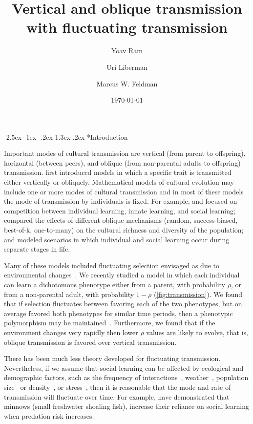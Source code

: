 \documentclass[12pt]{extarticle} %
\title{Vertical and oblique transmission with fluctuating transmission}
\author[a]{Yoav Ram}
\author[b]{Uri Liberman}
\author[a]{Marcus W. Feldman}
\affil[a]{Department of Biology, Stanford University, Stanford, CA}
\affil[b]{School of Mathematical Sciences, Tel Aviv University, Israel}
\date{\today}
\makeatletter
\renewcommand\section{\@startsection {section}{1}{\z@}%
     {-2.5ex \@plus -1ex \@minus -.2ex}%
     {1.3ex \@plus.2ex}%
    {\Large\bfseries}}
\makeatother
\begin{document}
\maketitle


\section*{Introduction}

Important modes of cultural transmission are vertical (from parent to offspring), horizontal (between peers), and oblique (from non-parental adults to offspring) transmission. 
\citet[ch.~3]{Cavalli-Sforza1981} first introduced models in which a specific trait is transmitted either vertically or obliquely.
Mathematical models of cultural evolution may include one or more modes of cultural transmission and in most of these models the mode of transmission by individuals is fixed. 
For example, \cite{Aoki2005} and \citet{McElreath2008} focused on competition between individual learning, innate learning, and social learning; \citet{Fogarty2017} compared the effects of different oblique mechanisms (random, success-biased, best-of-k, one-to-many) on the cultural richness and diversity of the population; and \citet{Aoki2012} modeled scenarios in which individual and social learning occur during separate stages in life.

Many of these models included fluctuating selection envisaged as due to environmental changes~\citep[reviewed in][]{Aoki2014}. 
We recently studied a model in which each individual can learn a dichotomous phenotype either from a parent, with probability $\rho$, or from a non-parental adult, with probability $1-\rho$ (\autoref{fig:transmission}).
We found that if selection fluctuates between favoring each of the two phenotypes, but on average favored both phenotypes for similar time periods, then a phenotypic polymorphism may be maintained~\citep{Ram2018}.
Furthermore, we found that if the environment changes very rapidly then lower $\rho$ values are likely to evolve, that is, oblique transmission is favored over vertical transmission.

There has been much less theory developed for fluctuating transmission.
Nevertheless, if we assume that social learning can be affected by ecological and demographic factors, such as the frequency of interactions~\citep{VanSchaik2003}, weather~\citep{Phithakkitnukoon2012}, population size~\citep{Fischer2015} or density~\citep{Aureli1997a}, or stress~\citep{Farine2015}, then it is reasonable that the mode and rate of transmission will fluctuate over time. 
For example, \citet{Webster2008} have demonstrated that minnows (small freshwater shoaling fish), increase their reliance on social learning when predation risk increases.
\end{document}
